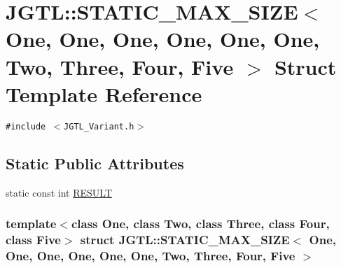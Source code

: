 \hypertarget{struct_j_g_t_l_1_1_s_t_a_t_i_c___m_a_x___s_i_z_e_3_01_one_00_01_one_00_01_one_00_01_one_00_01_on2fb88e04d0121b9aa29a50f9670e334c}{
\section{JGTL::STATIC\_\-MAX\_\-SIZE$<$ One, One, One, One, One, One, Two, Three, Four, Five $>$ Struct Template Reference}
\label{struct_j_g_t_l_1_1_s_t_a_t_i_c___m_a_x___s_i_z_e_3_01_one_00_01_one_00_01_one_00_01_one_00_01_on2fb88e04d0121b9aa29a50f9670e334c}
}
{\tt \#include $<$JGTL\_\-Variant.h$>$}

\subsection*{Static Public Attributes}
\begin{CompactItemize}
\item 
static const int \hyperlink{struct_j_g_t_l_1_1_s_t_a_t_i_c___m_a_x___s_i_z_e_3_01_one_00_01_one_00_01_one_00_01_one_00_01_on2fb88e04d0121b9aa29a50f9670e334c_2b45c44d4066a2069386f1f4f5653095}{RESULT}
\end{CompactItemize}
\subsubsection*{template$<$class One, class Two, class Three, class Four, class Five$>$ struct JGTL::STATIC\_\-MAX\_\-SIZE$<$ One, One, One, One, One, One, Two, Three, Four, Five $>$}



